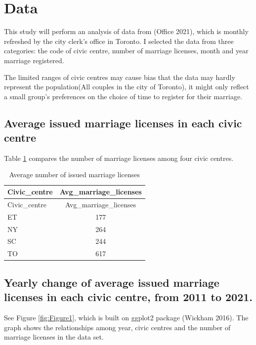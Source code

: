 \documentclass[
]{article}
\begin{document}
\hypertarget{data}{%
\section{Data}\label{data}}

This study will perform an analysis of data from (Office 2021), which is monthly refreshed by the city clerk's office in Toronto. I selected the data from three categories: the code of civic centre, number of marriage licenses, month and year marriage registered.

The limited ranges of civic centres may cause bias that the data may hardly represent the population(All couples in the city of Toronto), it might only reflect a small group's preferences on the choice of time to register for their marriage.

\hypertarget{average-issued-marriage-licenses-in-each-civic-centre}{%
\subsection{Average issued marriage licenses in each civic centre}\label{average-issued-marriage-licenses-in-each-civic-centre}}

Table \ref{tab:Table1} compares the number of marriage licenses among four civic centres.

\begin{longtable}[]{@{}lc@{}}
\caption{\label{tab:Table1}Average number of issued marriage licenses}\tabularnewline
\toprule
Civic\_centre & Avg\_marriage\_licenses\tabularnewline
\midrule
\endfirsthead
\toprule
Civic\_centre & Avg\_marriage\_licenses\tabularnewline
\midrule
\endhead
ET & 177\tabularnewline
NY & 264\tabularnewline
SC & 244\tabularnewline
TO & 617\tabularnewline
\bottomrule
\end{longtable}

\hypertarget{yearly-change-of-average-issued-marriage-licenses-in-each-civic-centre-from-2011-to-2021.}{%
\subsection{Yearly change of average issued marriage licenses in each civic centre, from 2011 to 2021.}\label{yearly-change-of-average-issued-marriage-licenses-in-each-civic-centre-from-2011-to-2021.}}

See Figure \ref{fig:Figure1}, which is built on ggplot2 package (Wickham 2016). The graph shows the relationships among year, civic centres and the number of marriage licenses in the data set.
\end{document}
